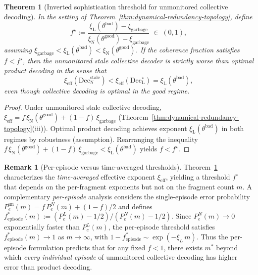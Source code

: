 \documentclass[11pt]{article}
\newcommand{\1}{\mathbf{1}}
\newcommand{\QCBdist}{\xi}
\theoremstyle{definition}
\newtheorem{remark}{Remark}
\theoremstyle{plain}
\newtheorem{theorem}{Theorem}
\begin{document}
\begin{theorem}[Inverted sophistication threshold for unmonitored collective decoding]
\label{thm:inverted-sophistication}
In the setting of Theorem~\ref{thm:dynamical-redundancy-topology}, define
\[
f^\star
:=
\frac{\QCBdist_{\mathrm{L}}(\theta^{\mathrm{bad}})-\QCBdist_{\mathrm{garbage}}}{\QCBdist_{\mathrm{N}}(\theta^{\mathrm{good}})-\QCBdist_{\mathrm{garbage}}}
\;\in\;(0,1),
\]
assuming $\QCBdist_{\mathrm{garbage}}<\QCBdist_{\mathrm{L}}(\theta^{\mathrm{bad}})<\QCBdist_{\mathrm{N}}(\theta^{\mathrm{good}})$.
If the coherence fraction satisfies $f<f^\star$, then the unmonitored stale collective decoder is strictly worse than optimal product decoding in the sense that
\[
\QCBdist_{\mathrm{eff}}(\mathrm{Dec}_{\mathrm{N}}^{\mathrm{stale}})
<
\QCBdist_{\mathrm{eff}}(\mathrm{Dec}_{\mathrm{L}}^{\star})
=
\QCBdist_{\mathrm{L}}(\theta^{\mathrm{bad}}),
\]
even though collective decoding is optimal in the good regime.
\end{theorem}

\begin{proof}
Under unmonitored stale collective decoding,
$\QCBdist_{\mathrm{eff}}=f\,\QCBdist_{\mathrm{N}}(\theta^{\mathrm{good}})+(1-f)\,\QCBdist_{\mathrm{garbage}}$ (Theorem~\ref{thm:dynamical-redundancy-topology}(iii)).
Optimal product decoding achieves exponent $\QCBdist_{\mathrm{L}}(\theta^{\mathrm{bad}})$ in both regimes by robustness (assumption).
Rearranging the inequality
$f\,\QCBdist_{\mathrm{N}}(\theta^{\mathrm{good}})+(1-f)\,\QCBdist_{\mathrm{garbage}} < \QCBdist_{\mathrm{L}}(\theta^{\mathrm{bad}})$
yields $f<f^\star$.
\end{proof}

\begin{remark}[Per-episode versus time-averaged thresholds]
\label{rem:fstar-two-formulations}
Theorem~\ref{thm:inverted-sophistication} characterizes the \emph{time-averaged} effective exponent $\QCBdist_{\mathrm{eff}}$, yielding a threshold $f^\star$ that depends on the per-fragment exponents but not on the fragment count $m$.
A complementary \emph{per-episode} analysis considers the single-episode error probability $P_e^{\mathrm{un}}(m) = f\,P_e^N(m) + (1{-}f)/2$ and defines
$f^*_{\mathrm{episode}}(m) := (P_e^L(m) - 1/2)/(P_e^N(m) - 1/2)$.
Since $P_e^N(m) \to 0$ exponentially faster than $P_e^L(m)$, the per-episode threshold satisfies $f^*_{\mathrm{episode}}(m) \to 1$ as $m\to\infty$, with $1 - f^*_{\mathrm{episode}} \sim \exp(-\QCBdist_L\,m)$.
Thus the per-episode formulation predicts that for any fixed $f < 1$, there exists $m^*$ beyond which \emph{every individual episode} of unmonitored collective decoding has higher error than product decoding.
\end{remark}
\end{document}
